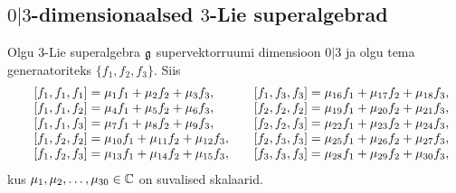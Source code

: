 
\subsection{\texorpdfstring{$0|3$}{0|3}-dimensionaalsed
    \texorpdfstring{$3$}{3}-Lie superalgebrad}

Olgu $3$-Lie superalgebra $\mathfrak{g}$ supervektorruumi dimensioon
$0|3$ ja olgu tema generaatoriteks $\{ f_1, f_2, f_3 \}$. Siis
\begin{align*}
    \begin{matrix*}[l]
        & [f_1, f_1, f_1] = \m_{1} f_1 + \m_{2} f_2 + \m_{3} f_3, \quad
        & [f_1, f_3, f_3] = \m_{16} f_1 + \m_{17} f_2 + \m_{18} f_3, \\
        & [f_1, f_1, f_2] = \m_{4} f_1 + \m_{5} f_2 + \m_{6} f_3, \quad
        & [f_2, f_2, f_2] = \m_{19} f_1 + \m_{20} f_2 + \m_{21} f_3, \\
        & [f_1, f_1, f_3] = \m_{7} f_1 + \m_{8} f_2 + \m_{9} f_3, \quad
        & [f_2, f_2, f_3] = \m_{22} f_1 + \m_{23} f_2 + \m_{24} f_3, \\
        & [f_1, f_2, f_2] = \m_{10} f_1 + \m_{11} f_2 + \m_{12} f_3, \quad
        & [f_2, f_3, f_3] = \m_{25} f_1 + \m_{26} f_2 + \m_{27} f_3, \\
        & [f_1, f_2, f_3] = \m_{13} f_1 + \m_{14} f_2 + \m_{15} f_3, \quad
        & [f_3, f_3, f_3] = \m_{28} f_1 + \m_{29} f_2 + \m_{30} f_3, \\
    \end{matrix*}
\end{align*}
kus $\mu_1, \mu_2, \dots, \mu_{30} \in \mathbb{C}$ on suvalised skalaarid.

